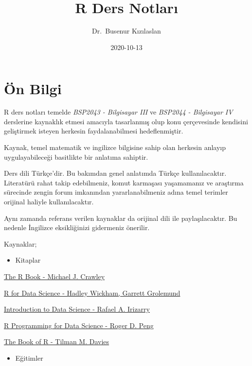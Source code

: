 \documentclass[
]{book}
\title{R Ders Notları}
\author{Dr.~Busenur Kızılaslan}
\date{2020-10-13}
\providecommand{\tightlist}{%
  \setlength{\itemsep}{0pt}\setlength{\parskip}{0pt}}
\begin{document}
\maketitle

{
\setcounter{tocdepth}{1}
\tableofcontents
}
\hypertarget{uxf6n-bilgi}{%
\chapter{Ön Bilgi}\label{uxf6n-bilgi}}

R ders notları temelde \emph{BSP2043 - Bilgisayar III} ve \emph{BSP2044 - Bilgisayar IV} derslerine kaynaklık etmesi amacıyla tasarlanmış olup konu çerçevesinde kendisini geliştirmek isteyen herkesin faydalanabilmesi hedeflenmiştir.

Kaynak, temel matematik ve ingilizce bilgisine sahip olan herkesin anlayıp uygulayabileceği basitlikte bir anlatıma sahiptir.

Ders dili Türkçe'dir. Bu bakımdan genel anlatımda Türkçe kullanılacaktır. Literatürü rahat takip edebilmeniz, komut karmaşası yaşamamanız ve araştırma sürecinde zengin forum imkanından yararlanabilmeniz adına temel terimler orijinal haliyle kullanılacaktır.

Aynı zamanda referans verilen kaynaklar da orijinal dili ile paylaşılacaktır. Bu nedenle İngilizce eksikliğinizi gidermeniz önerilir.

Kaynaklar;

\begin{itemize}
\tightlist
\item
  Kitaplar
\end{itemize}

\href{https://www.cs.upc.edu/~robert/teaching/estadistica/TheRBook.pdf}{The R Book - Michael J. Crawley}

\href{https://r4ds.had.co.nz}{R for Data Science - Hadley Wickham, Garrett Grolemund}

\href{https://rafalab.github.io/dsbook/}{Introduction to Data Science - Rafael A. Irizarry}

\href{https://bookdown.org/rdpeng/rprogdatascience/}{R Programming for Data Science - Roger D. Peng}

\href{https://web.itu.edu.tr/~tokerem/The_Book_of_R.pdf}{The Book of R - Tilman M. Davies}

\begin{itemize}
\tightlist
\item
  Eğitimler
\end{itemize}
\end{document}
